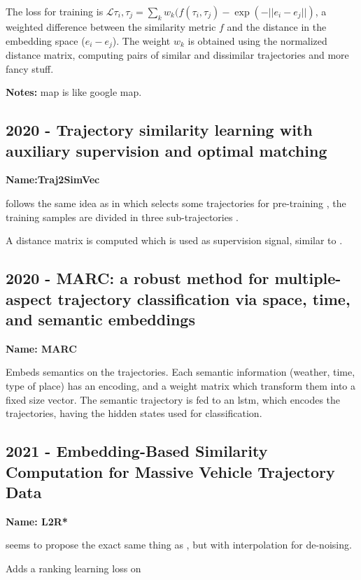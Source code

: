 The loss for training is $\mathcal{L}{\tau_i, \tau_j}=\sum_k w_k(f(\tau_i, \tau_j)-\exp(-||e_i-e_j||)$, a weighted difference between the similarity metric $f$ and the distance in the embedding space ($e_i-e_j$). The weight $w_k$ is obtained using the normalized distance matrix, computing pairs of similar and dissimilar trajectories and more fancy stuff.

\textbf{Notes:} map is like google map.

\subsection*{2020 - Trajectory similarity learning with auxiliary supervision and optimal matching}

\textbf{Name:Traj2SimVec}

\cite{zhang2020trajectory} follows the same idea as in \cite{yao2019computing} which selects some trajectories for pre-training , the training samples are divided in three sub-trajectories .

A distance matrix is computed which is used as supervision signal, similar to \cite{yao2019computing}.

\subsection*{2020 - MARC: a robust method for multiple-aspect trajectory classification via space, time, and semantic embeddings}

\textbf{Name: MARC}

\cite{may2020marc} Embeds semantics on the trajectories. Each semantic information (weather, time, type of place) has an encoding, and a weight matrix which transform them into a fixed size vector. The semantic trajectory is fed to an \gls{lstm}, which encodes the trajectories, having the hidden states used for classification.

\subsection*{2021 - Embedding-Based Similarity Computation for Massive Vehicle Trajectory Data}

\textbf{Name: L2R*}

\cite{chen2021embedding} seems to propose the exact same thing as \cite{yao2019computing}, but with interpolation for de-noising.

Adds a ranking learning loss on \cite{yao2019computing}

